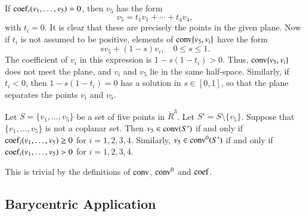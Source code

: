 \begin{tarskidata}
\begin{tarski}
\begin{proved}
If ${\operatorname{coef}}_i(v_1,\ldots,v_5)=0$, then $v_5$
has the form
	$$
	v_5 = t_1 v_1 + \cdots + t_4 v_4,
	$$
with $t_i=0$.  It is clear that these are
precisely the points in the given plane.
Now if $t_i$ is not assumed to be positive, 
elements of
${\operatorname{conv}}\{v_5,v_i\}$ have the form
	$$s v_5 + (1-s) v_i,\quad 0\le s \le 1.$$
The coefficient of $v_i$ in this expression
is $1-s(1-t_i)>0$.  Thus, ${\operatorname{conv}}\{v_5,v_i\}$
does not meet the plane, and $v_i$ and $v_5$
lie in the same half-space.  Similarly,
if $t_i<0$, then $1-s(1-t_i)=0$ has a solution
in $s\in[0,1]$, so that the plane separates the
points $v_i$ and $v_5$.
\swallowed\end{proved}
\end{tarski}




\begin{tarski}

\begin{lemma}
Let $S=\{v_1,\ldots,v_5\}$ be
a set of five points in $\ring{R}^3$.  Let $S'=S\setminus\{v_5\}$.
Suppose
that $\{v_1,\ldots,v_5\}$ is not a coplanar
set.  Then $v_5\in{\operatorname{conv}}(S')$ if and only
if  
${\operatorname{coef}}_i(v_1,\ldots,v_5)\ge0$ 
for $i=1,2,3,4$.
Similarly, $v_5\in{\operatorname{conv}}^0(S')$ if and only
if  
${\operatorname{coef}}_i(v_1,\ldots,v_5)>0$ 
for $i=1,2,3,4$.
\end{lemma}

\begin{proved}  This is trivial by the definitions
of ${\operatorname{conv}}$, ${\operatorname{conv}}^0$ and ${\operatorname{coef}}$.
\swallowed\end{proved}
\end{tarski}














\begin{tarski}
\section{Barycentric Application}


\end{tarski}
\end{tarskidata}
